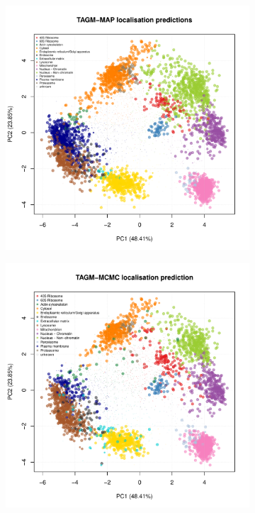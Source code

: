 \documentclass[12pt,english]{article}\usepackage[]{graphicx}\usepackage[]{color}
\makeatletter
\def\maxwidth{ %
  \ifdim\Gin@nat@width>\linewidth
    \linewidth
  \else
    \Gin@nat@width
  \fi
}
\newenvironment{knitrout}{}{} %
\makeatother
\begin{document}
\begin{figure}[ht]
    \begin{subfigure}[t]{0.5\textwidth}
\begin{knitrout}
\color{fgcolor}
\includegraphics[width=\maxwidth]{figure/assignmentPCAMAP-1} 

\end{knitrout}
    \end{subfigure}%
    \begin{subfigure}[t]{0.5\textwidth}
\begin{knitrout}
\color{fgcolor}
\includegraphics[width=\maxwidth]{figure/assignmentPCAMCMC-1} 


\end{knitrout}
\end{subfigure}
\end{figure}
\end{document}
